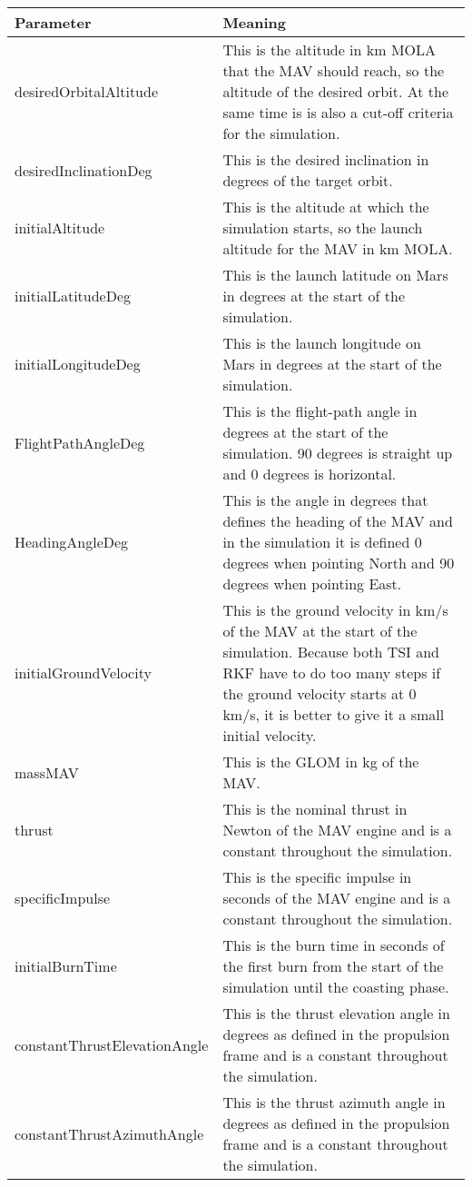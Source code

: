 \begin{longtable}{|l|p{10cm}|}
\textbf{Parameter} & \textbf{Meaning} \\ \hline 
desiredOrbitalAltitude & This is the altitude in km \ac{MOLA} that the \ac{MAV} should reach, so the altitude of the desired orbit. At the same time is is also a cut-off criteria for the simulation.  \\ \hline
desiredInclinationDeg & This is the desired inclination in degrees of the target orbit. \\ \hline
initialAltitude & This is the altitude at which the simulation starts, so the launch altitude for the \ac{MAV} in km \ac{MOLA}. \\ \hline
initialLatitudeDeg & This is the launch latitude on Mars in degrees at the start of the simulation. \\ \hline
initialLongitudeDeg & This is the launch longitude on Mars in degrees at the start of the simulation. \\ \hline
FlightPathAngleDeg & This is the flight-path angle in degrees at the start of the simulation. 90 degrees is straight up and 0 degrees is horizontal. \\ \hline
HeadingAngleDeg & This is the angle in degrees that defines the heading of the \ac{MAV} and in the simulation it is defined 0 degrees when pointing North and 90 degrees when pointing East. \\ \hline
initialGroundVelocity & This is the ground velocity in km/s of the \ac{MAV} at the start of the simulation. Because both \ac{TSI} and \ac{RKF} have to do too many steps if the ground velocity starts at 0 km/s, it is better to give it a small initial velocity.\\ \hline
massMAV & This is the \ac{GLOM} in kg of the \ac{MAV}.\\ \hline
thrust & This is the nominal thrust in Newton of the \ac{MAV} engine and is a constant throughout the simulation.\\ \hline
specificImpulse & This is the specific impulse in seconds of the \ac{MAV} engine and is a constant throughout the simulation. \\ \hline
initialBurnTime & This is the burn time in seconds of the first burn from the start of the simulation until the coasting phase.\\ \hline
constantThrustElevationAngle & This is the thrust elevation angle in degrees as defined in the propulsion frame and is a constant throughout the simulation. \\ \hline
constantThrustAzimuthAngle & This is the thrust azimuth angle in degrees as defined in the propulsion frame and is a constant throughout the simulation. \\ \hline

\end{longtable}

